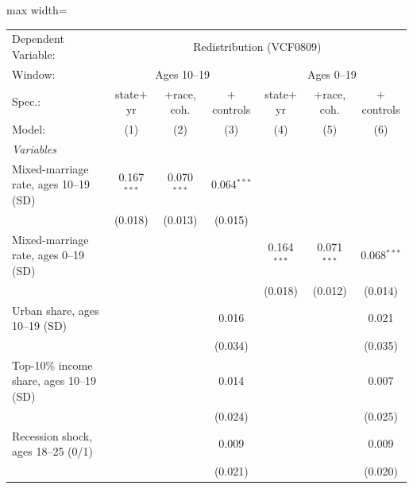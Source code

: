       \begin{adjustbox}{max width=\linewidth}
   \begin{tabular}{lcccccc}
      \tabularnewline \midrule \midrule
      Dependent Variable: & \multicolumn{6}{c}{Redistribution (VCF0809)}\\
      Window: & \multicolumn{3}{c}{Ages 10--19} & \multicolumn{3}{c}{Ages 0--19} \\ 
      Spec.:                                   & state$+$yr    & $+$race, coh. & $+$controls   & state$+$yr    & $+$race, coh. & $+$controls \\   
      Model:                                   & (1)           & (2)           & (3)           & (4)           & (5)           & (6)\\  
      \midrule
      \emph{Variables}\\
      Mixed-marriage rate, ages 10--19 (SD)    & 0.167$^{***}$ & 0.070$^{***}$ & 0.064$^{***}$ &               &               &   \\   
                                               & (0.018)       & (0.013)       & (0.015)       &               &               &   \\   
      Mixed-marriage rate, ages 0--19 (SD)     &               &               &               & 0.164$^{***}$ & 0.071$^{***}$ & 0.068$^{***}$\\   
                                               &               &               &               & (0.018)       & (0.012)       & (0.014)\\   
      Urban share, ages 10--19 (SD)            &               &               & 0.016         &               &               & 0.021\\   
                                               &               &               & (0.034)       &               &               & (0.035)\\   
      Top-10\% income share, ages 10--19 (SD)  &               &               & 0.014         &               &               & 0.007\\   
                                               &               &               & (0.024)       &               &               & (0.025)\\   
      Recession shock, ages 18--25 (0/1)       &               &               & 0.009         &               &               & 0.009\\   
                                               &               &               & (0.021)       &               &               & (0.020)\\   

\end{tabular}
\end{adjustbox}
